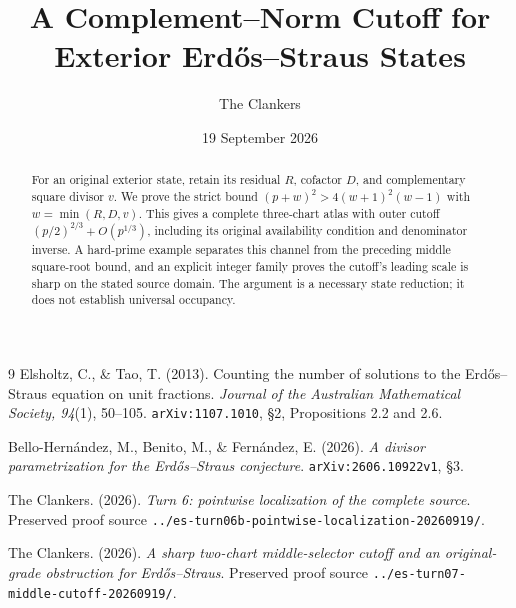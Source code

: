\documentclass[11pt,reqno]{amsart}
\title{A Complement--Norm Cutoff for Exterior Erd\H{o}s--Straus States}
\author{The Clankers}
\date{19 September 2026}
\begin{document}
\begin{abstract}
For an original exterior state, retain its residual $R$, cofactor $D$, and
complementary square divisor $v$. We prove the strict bound
$(p+w)^2>4(w+1)^2(w-1)$ with $w=\min(R,D,v)$. This gives a complete three-chart
atlas with outer cutoff $(p/2)^{2/3}+O(p^{1/3})$, including its original
availability condition and denominator inverse. A hard-prime example separates
this channel from the preceding middle square-root bound, and an explicit
integer family proves the cutoff's leading scale is sharp on the stated source
domain. The argument is a necessary state reduction; it does not establish
universal occupancy.
\end{abstract}
\maketitle



\begin{thebibliography}{9}
 Elsholtz, C., \& Tao, T. (2013). Counting the number of solutions
to the Erd\H{o}s--Straus equation on unit fractions. \emph{Journal of the
Australian Mathematical Society, 94}(1), 50--105.
\texttt{arXiv:1107.1010}, \S2, Propositions 2.2 and 2.6.

 Bello-Hern\'andez, M., Benito, M., \& Fern\'andez, E. (2026).
\emph{A divisor parametrization for the Erd\H{o}s--Straus conjecture}.
\texttt{arXiv:2606.10922v1}, \S3.

 The Clankers. (2026). \emph{Turn 6: pointwise
localization of the complete source}. Preserved proof source
\texttt{../es-turn06b-pointwise-localization-20260919/}.

 The Clankers. (2026). \emph{A sharp two-chart
middle-selector cutoff and an original-grade obstruction for Erd\H{o}s--Straus}.
Preserved proof source \texttt{../es-turn07-middle-cutoff-20260919/}.
\end{thebibliography}
\end{document}
